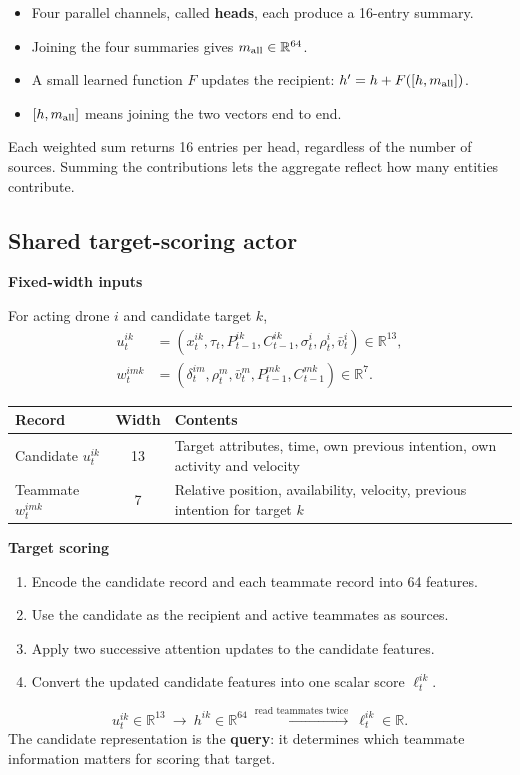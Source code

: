 \documentclass[11pt,a4paper]{article}
\newcommand{\R}{\mathbb R}
\newcommand{\lead}[1]{\medskip\textbf{#1}\par}
\begin{document}
\begin{itemize}
\item Four parallel channels, called \textbf{heads}, each produce a 16-entry summary.
\item Joining the four summaries gives $m_{\rm all}\in\R^{64}$.
\item A small learned function $F$ updates the recipient:
$h' = h+F([h,m_{\rm all}])$.
\item $[h,m_{\rm all}]$ means joining the two vectors end to end.
\end{itemize}
Each weighted sum returns 16 entries per head,
regardless of the number of sources. Summing the contributions lets the
aggregate reflect how many entities contribute.

\newpage
\subsection{Shared target-scoring actor}
\lead{Fixed-width inputs}
For acting drone $i$ and candidate target $k$,
\begin{align*}
u_t^{ik}&=(x_t^{ik},\tau_t,P_{t-1}^{ik},C_{t-1}^{ik},\sigma_t^i,\rho_t^i,\bar v_t^i)\in\R^{13},\\
w_t^{imk}&=(\delta_t^{im},\rho_t^m,\bar v_t^m,P_{t-1}^{mk},C_{t-1}^{mk})\in\R^7.
\end{align*}
\begin{center}
\begin{tabularx}{\linewidth}{@{}lcX@{}}
\toprule
Record & Width & Contents \\
\midrule
Candidate $u_t^{ik}$ & 13 & Target attributes, time, own previous intention, own activity and velocity \\
Teammate $w_t^{imk}$ & 7 & Relative position, availability, velocity, previous intention for target $k$ \\
\bottomrule
\end{tabularx}
\end{center}

\lead{Target scoring}
\begin{enumerate}
\item Encode the candidate record and each teammate record into 64 features.
\item Use the candidate as the recipient and active teammates as sources.
\item Apply two successive attention updates to the candidate features.
\item Convert the updated candidate features into one scalar score $\ell_t^{ik}$.
\end{enumerate}
\[
\boxed{u_t^{ik}\in\R^{13}}\ \longrightarrow\
\boxed{h^{ik}\in\R^{64}}\ \xrightarrow{\text{read teammates twice}}\
\boxed{\ell_t^{ik}\in\R}.
\]
The candidate representation is the \textbf{query}: it determines which
teammate information matters for scoring that target.
\end{document}
